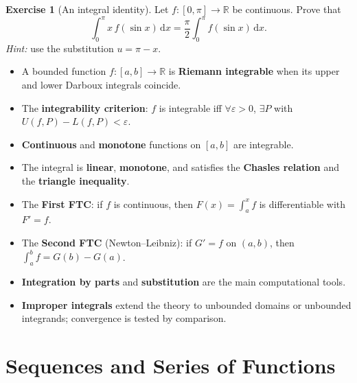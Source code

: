 \documentclass[12pt,a4paper]{book}
\theoremstyle{definition}
\newtheorem{exercise}{Exercise}[chapter]
\newcommand{\R}{\mathbb{R}}
\newcommand{\eps}{\varepsilon}
\newcommand{\dd}{\,\mathrm{d}}
\begin{document}
\begin{exercise}[An integral identity]\label{exo:exer-integral-identity}
  Let $f\colon[0,\pi]\to\R$ be continuous.  Prove that
  \[
    \int_0^\pi x\,f(\sin x)\dd x = \frac{\pi}{2}\int_0^\pi f(\sin x)\dd x.
  \]
  \emph{Hint:} use the substitution $u=\pi-x$.
\end{exercise}

\bigskip
\begin{tcolorbox}[colback=gray!5, colframe=gray!60, title={\textbf{Chapter 7 --- Summary}}]
\begin{itemize}[leftmargin=*]
  \item A bounded function $f\colon[a,b]\to\R$ is \textbf{Riemann integrable}
    when its upper and lower Darboux integrals coincide.
  \item The \textbf{integrability criterion}: $f$ is integrable iff
    $\forall\eps>0$, $\exists P$ with $U(f,P)-L(f,P)<\eps$.
  \item \textbf{Continuous} and \textbf{monotone} functions on $[a,b]$ are
    integrable.
  \item The integral is \textbf{linear}, \textbf{monotone}, and satisfies the
    \textbf{Chasles relation} and the \textbf{triangle inequality}.
  \item The \textbf{First FTC}: if $f$ is continuous, then
    $F(x)=\int_a^x f$ is differentiable with $F'=f$.
  \item The \textbf{Second FTC} (Newton--Leibniz): if $G'=f$ on $(a,b)$,
    then $\int_a^b f = G(b)-G(a)$.
  \item \textbf{Integration by parts} and \textbf{substitution} are the main
    computational tools.
  \item \textbf{Improper integrals} extend the theory to unbounded domains
    or unbounded integrands; convergence is tested by comparison.
\end{itemize}
\end{tcolorbox}




\chapter{Sequences and Series of Functions}\label{ch:seq-series-fn}
\end{document}
